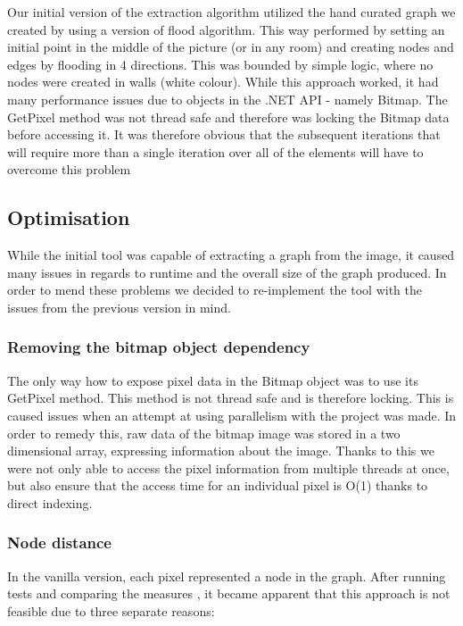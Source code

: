 \documentclass[main.tex]{subfiles}
\begin{document}
Our initial version of the extraction algorithm utilized the hand curated graph we created by using a version of flood algorithm. This way performed by setting an initial point in the middle of the picture (or in any room)  and creating nodes and edges by flooding in 4 directions. This was bounded by simple logic, where no nodes were created in walls (white colour). While this approach worked, it had many performance issues due to objects in the .NET API - namely Bitmap. The GetPixel method was not thread safe and therefore was locking the Bitmap data before accessing it. It was therefore obvious that the subsequent iterations that will require more than a single iteration over all of the elements will have to overcome this problem

\subsection{Optimisation}
While the initial tool was capable of extracting a graph from the image, it caused many issues in regards to runtime and the overall size of the graph produced. In order to mend these problems we decided to re-implement the tool with the issues from the previous version in mind. 

\subsubsection{Removing the bitmap object dependency}

The only way how to expose pixel data in the Bitmap object was to use its GetPixel method. This method is not thread safe and is therefore locking. This is caused issues when an attempt at using parallelism with the project was made. In order to remedy this, raw data of the bitmap image was stored in a two dimensional array, expressing information about the image. Thanks to this we were not only able to access the pixel information from multiple threads at once, but also ensure that the access time for an individual pixel is O(1) thanks to direct indexing. 

\subsubsection{Node distance}
In the vanilla version, each pixel represented a node in the graph. After running tests and comparing the measures , it became apparent that this approach is not feasible due to three separate reasons:
	
\end{document}
